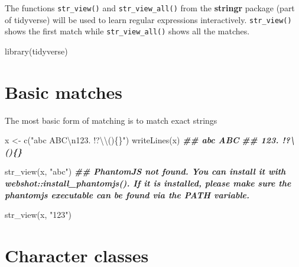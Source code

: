 \documentclass[
]{book}
\newenvironment{Shaded}{\begin{snugshade}}{\end{snugshade}}
\newcommand{\DocumentationTok}[1]{\textcolor[rgb]{0.56,0.35,0.01}{\textbf{\textit{#1}}}}
\newcommand{\FunctionTok}[1]{\textcolor[rgb]{0.00,0.00,0.00}{#1}}
\newcommand{\NormalTok}[1]{#1}
\newcommand{\OtherTok}[1]{\textcolor[rgb]{0.56,0.35,0.01}{#1}}
\newcommand{\SpecialCharTok}[1]{\textcolor[rgb]{0.00,0.00,0.00}{#1}}
\newcommand{\StringTok}[1]{\textcolor[rgb]{0.31,0.60,0.02}{#1}}
\begin{document}
The functions \texttt{str\_view()} and \texttt{str\_view\_all()} from the \textbf{stringr} package (part of tidyverse) will be used to learn regular expressions interactively. \texttt{str\_view()} shows the first match while \texttt{str\_view\_all()} shows all the matches.

\begin{Shaded}
\begin{Highlighting}[]
\FunctionTok{library}\NormalTok{(tidyverse)}
\end{Highlighting}
\end{Shaded}

\hypertarget{basic-matches}{%
\section{Basic matches}\label{basic-matches}}

The most basic form of matching is to match exact strings

\begin{Shaded}
\begin{Highlighting}[]
\NormalTok{x }\OtherTok{\textless{}{-}} \FunctionTok{c}\NormalTok{(}\StringTok{"abc ABC}\SpecialCharTok{\textbackslash{}n}\StringTok{123. !?}\SpecialCharTok{\textbackslash{}\textbackslash{}}\StringTok{()\{\}"}\NormalTok{)}
\FunctionTok{writeLines}\NormalTok{(x)}
\DocumentationTok{\#\# abc ABC}
\DocumentationTok{\#\# 123. !?\textbackslash{}()\{\}}
\end{Highlighting}
\end{Shaded}

\begin{Shaded}
\begin{Highlighting}[]
\FunctionTok{str\_view}\NormalTok{(x, }\StringTok{"abc"}\NormalTok{)}
\DocumentationTok{\#\# PhantomJS not found. You can install it with webshot::install\_phantomjs(). If it is installed, please make sure the phantomjs executable can be found via the PATH variable.}
\end{Highlighting}
\end{Shaded}

\begin{Shaded}
\begin{Highlighting}[]
\FunctionTok{str\_view}\NormalTok{(x, }\StringTok{"123"}\NormalTok{)}
\end{Highlighting}
\end{Shaded}

\hypertarget{regex-classes}{%
\section{Character classes}\label{regex-classes}}
\end{document}
